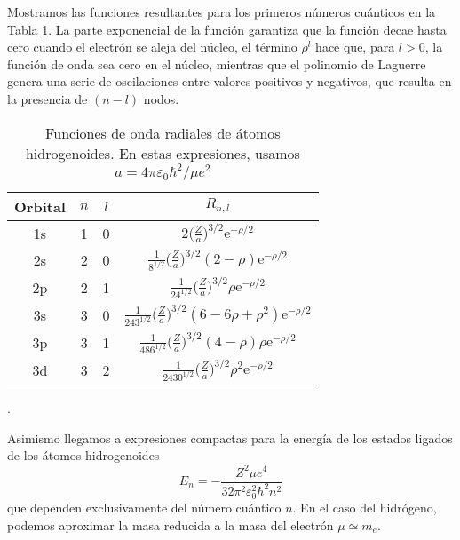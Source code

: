\documentclass{tufte-handout}
\begin{document}
Mostramos las 
funciones resultantes para los primeros números cuánticos en
la Tabla \ref{tb:radial_hydrogenoid}. La parte exponencial de
la función garantiza que la función decae hasta cero cuando
el electrón se aleja del núcleo, el término $\rho^l$ hace
que, para $l>0$, la función de onda sea cero en el núcleo, 
mientras que el polinomio de Laguerre genera una serie de 
oscilaciones entre valores positivos y negativos, que resulta
en la presencia de $(n-l)$ nodos. 
\begin{table}[b!]
    \centering
    \begin{tabular}{|c|c|c|c|}
    \hline
         Orbital & $n$  & $l$ &$R_{n,l}$ \\
    \hline
    \hline
         1s & 1 & 0 & 
         $2\bigg(\frac{Z}{a}\bigg)^{3/2}\mathrm{e}^{-\rho/2}$ \\
         2s & 2 & 0 & 
         $\frac{1}{8^{1/2}}\bigg(\frac{Z}{a}\bigg)^{3/2}(2-\rho) \mathrm{e}^{-\rho/2}$\\
         2p & 2 & 1 & 
         $\frac{1}{24^{1/2}}\bigg(\frac{Z}{a}\bigg)^{3/2}\rho \mathrm{e}^{-\rho/2}$\\
         3s & 3 & 0 & 
         $\frac{1}{243^{1/2}}\bigg(\frac{Z}{a})^{3/2}(6-6\rho+\rho^2)\mathrm{e}^{-\rho/2}$ \\
         3p & 3 & 1 &
         $\frac{1}{486^{1/2}}\bigg(\frac{Z}{a}\bigg)^{3/2}(4-\rho)\rho \mathrm{e}^{-\rho/2}$ \\
         3d & 3 & 2 & $\frac{1}{2430^{1/2}}\bigg(\frac{Z}{a}\bigg)^{3/2}\rho^2\mathrm{e}^{-\rho/2}$ \\
    \hline
    \end{tabular}
    \caption{Funciones de onda radiales de átomos hidrogenoides. En estas expresiones, 
    usamos $a=4 \pi \varepsilon_0\hbar^2/\mu e^2$}. %
    \label{tb:radial_hydrogenoid}
\end{table}



Asimismo llegamos a expresiones compactas para la energía de 
los estados ligados de los átomos hidrogenoides
\begin{equation}
    E_n=-\frac{Z^2\mu e^4}{32\pi^2\varepsilon_0^2\hbar^2 n^2}
    \label{eq:Eh}
\end{equation}
que dependen exclusivamente del número cuántico $n$. 
En el caso del hidrógeno, podemos aproximar la masa reducida
a la masa del electrón $\mu\simeq m_e$. 
\end{document}
